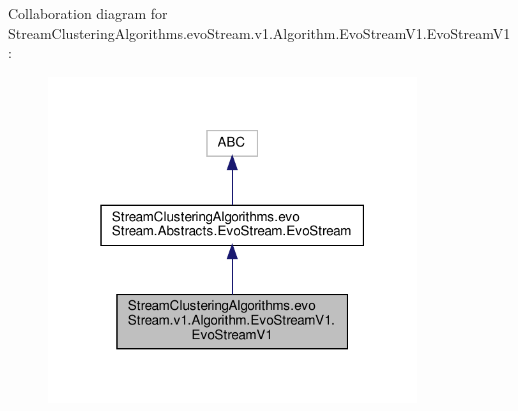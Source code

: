Collaboration diagram for Stream\+Clustering\+Algorithms.\+evo\+Stream.\+v1.\+Algorithm.\+Evo\+Stream\+V1.\+Evo\+Stream\+V1\+:\nopagebreak
\begin{figure}[H]
\begin{center}
\leavevmode
\includegraphics[width=277pt]{classStreamClusteringAlgorithms_1_1evoStream_1_1v1_1_1Algorithm_1_1EvoStreamV1_1_1EvoStreamV1__coll__graph}
\end{center}
\end{figure}
